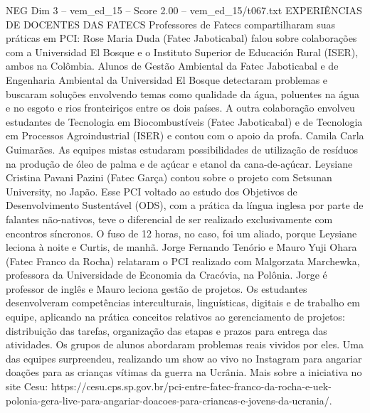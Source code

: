 \begin{textsample}{NEG Dim 3 – vem\_ed\_15 – Score 2.00 – vem\_ed\_15/t067.txt}  \label{ex:f3_neg_110}
EXPERIÊNCIAS DE DOCENTES DAS FATECS Professores de Fatecs compartilharam suas práticas em PCI: Rose Maria Duda (Fatec Jaboticabal) falou sobre colaborações com a Universidad El Bosque e o Instituto Superior de Educación Rural (ISER), ambos na Colômbia.
Alunos de Gestão Ambiental da Fatec Jaboticabal e de Engenharia Ambiental da Universidad El Bosque detectaram problemas e buscaram soluções envolvendo temas como qualidade da água, poluentes na água e no esgoto e rios fronteiriços entre os dois países.
A outra colaboração envolveu estudantes de Tecnologia em Biocombustíveis (Fatec Jaboticabal) e de Tecnologia em Processos Agroindustrial (ISER) e contou com o apoio da profa.
Camila Carla Guimarães.
As equipes mistas estudaram possibilidades de utilização de resíduos na produção de óleo de palma e de açúcar e etanol da cana-de-açúcar.
Leysiane Cristina Pavani Pazini (Fatec Garça) contou sobre o projeto com Setsunan University, no Japão.
Esse PCI voltado ao estudo dos Objetivos de Desenvolvimento Sustentável (ODS), com a prática da língua inglesa por parte de falantes não-nativos, teve o diferencial de ser realizado exclusivamente com encontros síncronos.
O fuso de 12 horas, no caso, foi um aliado, porque Leysiane leciona à noite e Curtis, de manhã.
Jorge Fernando Tenório e Mauro Yuji Ohara (Fatec Franco da Rocha) relataram o PCI realizado com Malgorzata Marchewka, professora da Universidade de Economia da Cracóvia, na Polônia.
Jorge é professor de inglês e Mauro leciona gestão de projetos.
Os estudantes desenvolveram competências interculturais, linguísticas, digitais e de trabalho em equipe, aplicando na prática conceitos relativos ao gerenciamento de projetos: distribuição das tarefas, organização das etapas e prazos para entrega das atividades.
Os grupos de alunos abordaram problemas reais vividos por eles.
Uma das equipes surpreendeu, realizando um show ao vivo no Instagram para angariar doações para as crianças vítimas da guerra na Ucrânia.
Mais sobre a iniciativa no site Cesu: https://cesu.cps.sp.gov.br/pci-entre-fatec-franco-da-rocha-e-uek-polonia-gera-live-para-angariar-doacoes-para-criancas-e-jovens-da-ucrania/.

\end{textsample}
